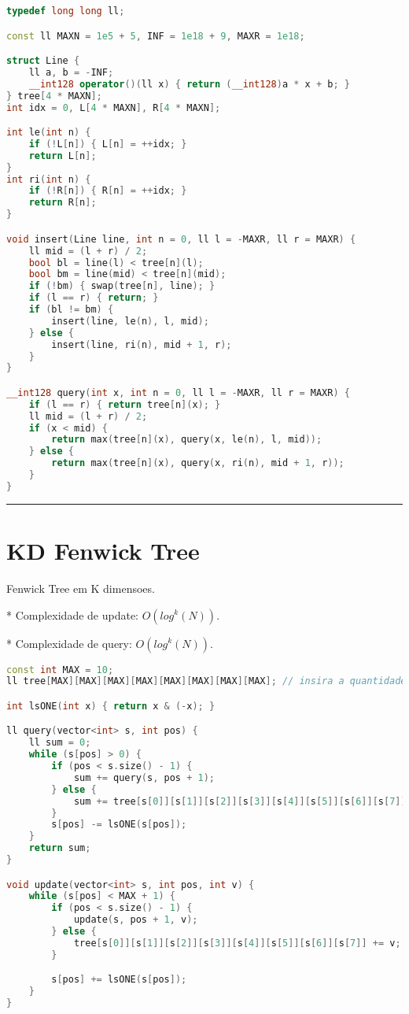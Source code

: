 \documentclass[11pt, a4paper, twoside]{book}
\begin{document}
\hfill

\begin{lstlisting}[language=C++]
typedef long long ll;

const ll MAXN = 1e5 + 5, INF = 1e18 + 9, MAXR = 1e18;

struct Line {
    ll a, b = -INF;
    __int128 operator()(ll x) { return (__int128)a * x + b; }
} tree[4 * MAXN];
int idx = 0, L[4 * MAXN], R[4 * MAXN];

int le(int n) {
    if (!L[n]) { L[n] = ++idx; }
    return L[n];
}
int ri(int n) {
    if (!R[n]) { R[n] = ++idx; }
    return R[n];
}

void insert(Line line, int n = 0, ll l = -MAXR, ll r = MAXR) {
    ll mid = (l + r) / 2;
    bool bl = line(l) < tree[n](l);
    bool bm = line(mid) < tree[n](mid);
    if (!bm) { swap(tree[n], line); }
    if (l == r) { return; }
    if (bl != bm) {
        insert(line, le(n), l, mid);
    } else {
        insert(line, ri(n), mid + 1, r);
    }
}

__int128 query(int x, int n = 0, ll l = -MAXR, ll r = MAXR) {
    if (l == r) { return tree[n](x); }
    ll mid = (l + r) / 2;
    if (x < mid) {
        return max(tree[n](x), query(x, le(n), l, mid));
    } else {
        return max(tree[n](x), query(x, ri(n), mid + 1, r));
    }
}
\end{lstlisting}

\hfill

\rule{\textwidth}{0.4pt}

\section{KD Fenwick Tree}



Fenwick Tree em K dimensoes.



* Complexidade de update: $O(log^k(N))$.

* Complexidade de query: $O(log^k(N))$.

\hfill

\begin{lstlisting}[language=C++]
const int MAX = 10;
ll tree[MAX][MAX][MAX][MAX][MAX][MAX][MAX][MAX]; // insira a quantidade necessaria de dimensoes

int lsONE(int x) { return x & (-x); }

ll query(vector<int> s, int pos) {
    ll sum = 0;
    while (s[pos] > 0) {
        if (pos < s.size() - 1) {
            sum += query(s, pos + 1);
        } else {
            sum += tree[s[0]][s[1]][s[2]][s[3]][s[4]][s[5]][s[6]][s[7]];
        }
        s[pos] -= lsONE(s[pos]);
    }
    return sum;
}

void update(vector<int> s, int pos, int v) {
    while (s[pos] < MAX + 1) {
        if (pos < s.size() - 1) {
            update(s, pos + 1, v);
        } else {
            tree[s[0]][s[1]][s[2]][s[3]][s[4]][s[5]][s[6]][s[7]] += v;
        }

        s[pos] += lsONE(s[pos]);
    }
}\end{lstlisting}
\end{document}
